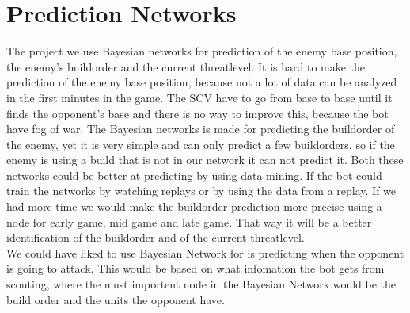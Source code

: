 \section{Prediction Networks}
	The project we use Bayesian networks for prediction of the enemy base position, the enemy's buildorder and the current threatlevel. 
	It is hard to make the prediction of the enemy base position, because not a lot of data can be analyzed in the first minutes in the game. The
	SCV have to go from base to base until it finds the opponent's base and there is no way to improve this, because the bot have fog of war.
	The Bayesian networks is made for predicting the buildorder of the enemy, yet it is very simple and can only predict a few buildorders, so if the enemy 		is using a build that is not in our network it can not predict it. Both these networks could be better at predicting by using data mining. If the 
	bot could train the networks by watching replays or by using the data from a replay. If we had more time we would make the buildorder prediction 
	more precise using a node for early game, mid game and late game. That way it will be a better identification of the buildorder and of the current 
	threatlevel. \\
		We could have liked to use Bayesian Network for is predicting when the opponent is going to attack. This would be based on what 				infomation the bot gets from scouting, where the must importent node in the Bayesian Network would be the build order and the units the opponent
	have. 